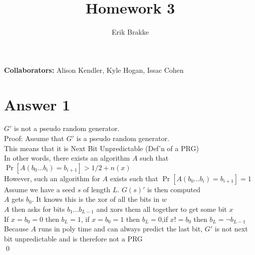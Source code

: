 \documentclass[11pt]{article}
\providecommand{\myparab}[1]{\smallskip\noindent\textbf{#1} }
\theoremstyle{definition}
\begin{document}
\title{Homework 3}
\author{Erik Brakke}
\maketitle

\thispagestyle{fancy}

\myparab{Collaborators: } Alison Kendler, Kyle Hogan, Issac Cohen
 
 
\section*{Answer 1}
$G'$ is not a pseudo random generator.\\
Proof: Assume that $G'$ is a pseudo random generator.\\
This means that it is Next Bit Unpredictable (Def'n of a PRG)\\
In other words, there exists an algorithm $A$ such that $\Pr[A(b_0...b_i) = b_{i+1}] > 1/2 + n(x)$\\
However, such an algorithm for $A$ exists such that $\Pr[A(b_0...b_i) = b_{i+1}] = 1$\\
Assume we have a seed $s$ of length $L$.  $G(s)'$ is then computed\\
$A$ gets $b_0$.  It knows this is the xor of all the bits in $w$\\
$A$ then asks for bits $b_1...b_{L-1}$ and xors them all together to get some bit $x$\\
If $x = b_0 = 0$ then $b_L = 1$, if $x = b_0 = 1$ then $b_L = 0$,if $x != b_0$ then $b_L = \neg b_{L-1}$\\
Because $A$ runs in poly time and can always predict the last bit, $G'$ is not next bit unpredictable and is therefore not a PRG\\
\qed
\end{document}
